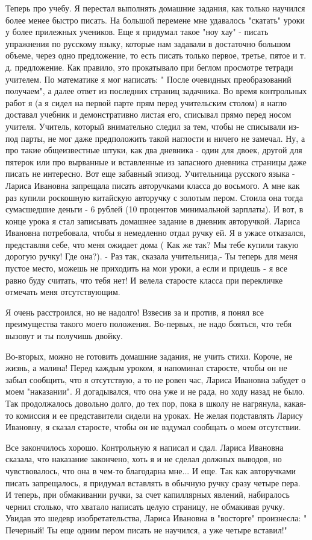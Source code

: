 Теперь про учебу. Я перестал выполнять домашние задания, как только научился
более менее быстро писать. На большой перемене мне удавалось "скатать" уроки у
более прилежных учеников. Еще я придумал такое "ноу хау" - писать упражнения по
русскому языку, которые нам задавали в достаточно большом объеме, через одно
предложение, то есть писать только первое, третье, пятое и т. д. предложение.
Как правило, это прокатывало при беглом просмотре тетради учителем. По
математике я мог написать: " После очевидных преобразований получаем", а далее
ответ из последних страниц задачника. Во время контрольных работ я (а я сидел
на первой парте прям перед учительским столом) я нагло доставал учебник и
демонстративно листая его, списывал прямо перед носом учителя. Учитель, который
внимательно следил за тем, чтобы не списывали из-под парты, не мог даже
предположить такой наглости и ничего не замечал. Ну, а про такие общеизвестные
штуки, как два дневника - один для двоек, другой для пятерок или про вырванные
и вставленные из запасного дневника страницы даже писать не интересно. Вот еще
забавный эпизод. Учительница русского языка - Лариса Ивановна запрещала писать
авторучками класса до восьмого. А мне как раз купили роскошную китайскую
авторучку с золотым пером. Стоила она тогда сумасшедшие деньги - 6 рублей (10
процентов минимальной зарплаты). И вот, в конце урока я стал записывать
домашнее задание в дневник авторучкой. Лариса Ивановна потребовала, чтобы я
немедленно отдал ручку ей. Я в ужасе отказался, представляя себе, что меня
ожидает дома ( Как же так? Мы тебе купили такую дорогую ручку! Где она?). - Раз
так, сказала учительница,- Ты теперь для меня пустое место, можешь не приходить
на мои уроки, а если и придешь - я все равно буду считать, что тебя нет! И
велела старосте класса при перекличке отмечать меня отсутствующим. 

Я очень расстроился, но не надолго! Взвесив за и против, я понял все
преимущества такого моего положения. Во-первых, не надо бояться, что тебя
вызовут и ты получишь двойку. 

Во-вторых, можно не готовить домашние задания, не учить стихи. Короче, не
жизнь, а малина! Перед каждым уроком, я напоминал старосте, чтобы он не забыл
сообщить, что я отсутствую, а то не ровен час, Лариса Ивановна забудет о моем
"наказании". Я догадывался, что она уже и не рада, но ходу назад не было. Так
продолжалось довольно долго, до тех пор, пока в школу не нагрянула, какая-то
комиссия и ее представители сидели на уроках. Не желая подставлять Ларису
Ивановну, я сказал старосте, чтобы он не вздумал сообщать о моем отсутствии.

Все закончилось хорошо. Контрольную я написал и сдал. Лариса Ивановна сказала,
что наказание закончено, хоть я и не сделал должных выводов, но чувствовалось,
что она в чем-то благодарна мне... И еще. Так как авторучками писать
запрещалось, я придумал вставлять в обычную ручку сразу четыре пера. И теперь,
при обмакивании ручки, за счет капиллярных явлений, набиралось чернил столько,
что хватало написать целую страницу, не обмакивая ручку. Увидав это шедевр
изобретательства, Лариса Ивановна в "восторге" произнесла: " Печерный! Ты еще
одним пером писать не научился, а уже четыре вставил!"

